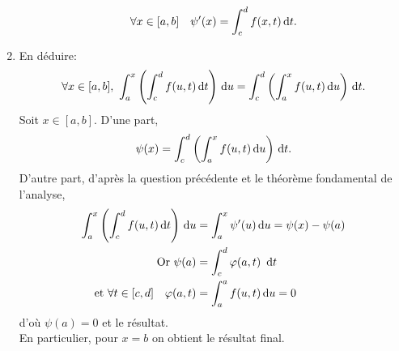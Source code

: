 \begin{preuve}
\begin{enumerate}
        $$\forall x \in [a, b] \quad \psi'(x) = \int_{c}^{d} f(x, t) \, \mathrm{d} t.$$
        \item En déduire:
        $$\forall x \in [a, b],\ \int_{a}^{x} \left ( \int_{c}^{d} f(u,t) \d t \right) \d u = \int_{c}^{d} \left ( \int_{a}^{x} f(u,t) \d u \right) \d t.$$
        Soit $x \in [a, b]$. D'une part,
        $$\psi(x) = \int_{c}^{d} \left ( \int_{a}^{x} f(u,t) \, \mathrm{d} u \right) \, \mathrm{d} t.$$
        D'autre part, d'après la question précédente et le théorème fondamental de l'analyse, 
        \begin{align*}
            \int_{a}^{x} \left ( \int_{c}^{d} f(u,t) \, \mathrm{d} t \right) \, \mathrm{d} u &= \int_{a}^{x} \psi'(u) \, \mathrm{d} u  = \psi(x) - \psi(a) \\
            \text{Or } \psi(a) &= \int_{c}^{d} \varphi(a, t)\ \, \mathrm{d} t \\
            \text{et } \forall t \in [c, d] \quad \varphi(a, t) &= \int_{a}^{a} f(u, t) \, \mathrm{d} u = 0
        \end{align*}
        d'où $\psi(a) = 0$ et le résultat. \\
        En particulier, pour $x = b$ on obtient le résultat final.
    \end{enumerate}
\end{preuve}    
